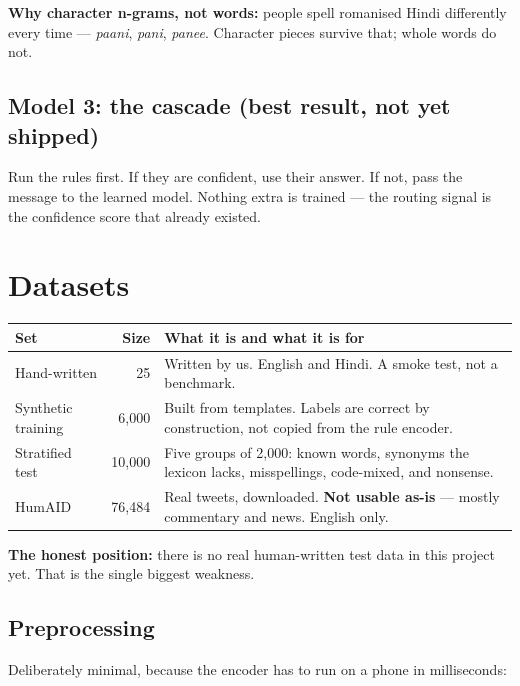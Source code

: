 \documentclass[11pt,a4paper]{article}
\begin{document}
\textbf{Why character n-grams, not words:} people spell romanised Hindi
differently every time --- \emph{paani}, \emph{pani}, \emph{panee}. Character
pieces survive that; whole words do not.

\subsection{Model 3: the cascade (best result, not yet shipped)}

Run the rules first. If they are confident, use their answer. If not, pass the
message to the learned model. Nothing extra is trained --- the routing signal
is the confidence score that already existed.

\section{Datasets}

\begin{center}
\begin{tabular}{p{3.4cm} r p{8.4cm}}
\toprule
\textbf{Set} & \textbf{Size} & \textbf{What it is and what it is for} \\
\midrule
Hand-written & 25 & Written by us. English and Hindi. A smoke test, not a
benchmark. \\
\addlinespace
Synthetic training & 6{,}000 & Built from templates. Labels are correct by
construction, not copied from the rule encoder. \\
\addlinespace
Stratified test & 10{,}000 & Five groups of 2{,}000: known words, synonyms the
lexicon lacks, misspellings, code-mixed, and nonsense. \\
\addlinespace
HumAID & 76{,}484 & Real tweets, downloaded. \textbf{Not usable as-is} ---
mostly commentary and news. English only. \\
\bottomrule
\end{tabular}
\end{center}

\textbf{The honest position:} there is no real human-written test data in this
project yet. That is the single biggest weakness.

\subsection{Preprocessing}

Deliberately minimal, because the encoder has to run on a phone in
milliseconds:
\end{document}

